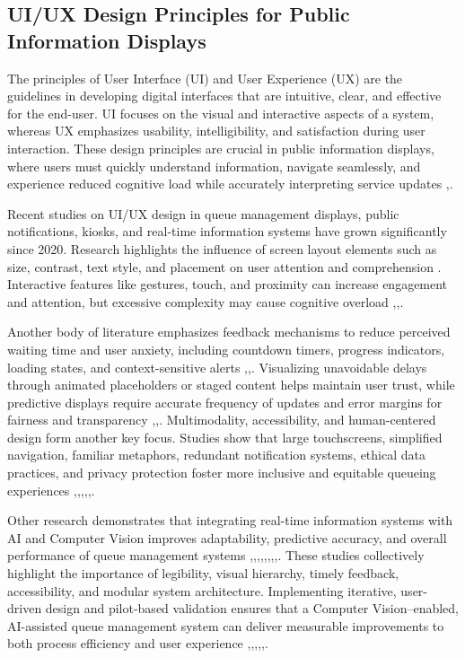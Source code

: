 \documentclass{research}
\begin{document}
\subsection{UI/UX Design Principles for Public Information Displays }
The principles of User Interface (UI) and User Experience (UX) are the guidelines in developing digital interfaces that are intuitive, clear, and effective for the end-user. UI focuses on the visual and interactive aspects of a system, whereas UX emphasizes usability, intelligibility, and satisfaction during user interaction. These design principles are crucial in public information displays, where users must quickly understand information, navigate seamlessly, and experience reduced cognitive load while accurately interpreting service updates \cite{ref54},\cite{ref55}.

Recent studies on UI/UX design in queue management displays, public notifications, kiosks, and real-time information systems have grown significantly since 2020. Research highlights the influence of screen layout elements such as size, contrast, text style, and placement on user attention and comprehension \cite{ref54}. Interactive features like gestures, touch, and proximity can increase engagement and attention, but excessive complexity may cause cognitive overload \cite{ref56},\cite{ref57},\cite{ref58}.

Another body of literature emphasizes feedback mechanisms to reduce perceived waiting time and user anxiety, including countdown timers, progress indicators, loading states, and context-sensitive alerts \cite{ref59},\cite{ref60},\cite{ref61}. Visualizing unavoidable delays through animated placeholders or staged content helps maintain user trust, while predictive displays require accurate frequency of updates and error margins for fairness and transparency \cite{ref62},\cite{ref63},\cite{ref53}. Multimodality, accessibility, and human-centered design form another key focus. Studies show that large touchscreens, simplified navigation, familiar metaphors, redundant notification systems, ethical data practices, and privacy protection foster more inclusive and equitable queueing experiences \cite{ref54},\cite{ref55},\cite{ref38},\cite{ref64},\cite{ref62},\cite{ref4}.

Other research demonstrates that integrating real-time information systems with AI and Computer Vision improves adaptability, predictive accuracy, and overall performance of queue management systems \cite{ref64},\cite{ref65},\cite{ref66},\cite{ref67},\cite{ref68},\cite{ref56},\cite{ref53},\cite{ref69},\cite{ref54}. These studies collectively highlight the importance of legibility, visual hierarchy, timely feedback, accessibility, and modular system architecture. Implementing iterative, user-driven design and pilot-based validation ensures that a Computer Vision–enabled, AI-assisted queue management system can deliver measurable improvements to both process efficiency and user experience \cite{ref56},\cite{ref61},\cite{ref59},\cite{ref63},\cite{ref55},\cite{ref65}.
\end{document}

